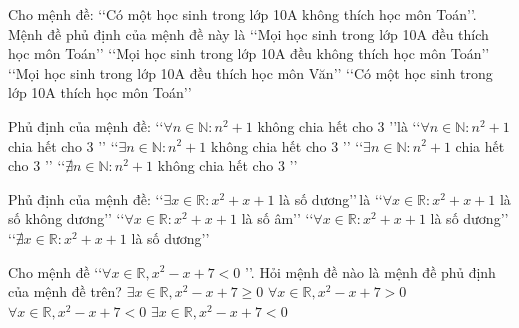 \begin{ex}%
	Cho mệnh đề: \lq\lq Có một học sinh trong lớp 10A không thích học môn Toán\rq\rq. Mệnh đề phủ  định của mệnh đề này là
	 \choice
		{\True \lq\lq Mọi học sinh  trong lớp 10A đều thích học môn Toán\rq\rq}
		{\lq\lq Mọi  học sinh trong lớp 10A đều không thích học môn Toán\rq\rq}
		{\lq\lq Mọi học sinh  trong lớp 10A đều thích học môn Văn\rq\rq}
		{\lq\lq Có một học sinh trong lớp 10A thích học  môn Toán\rq\rq}
\end{ex}

\begin{ex}%
	Phủ định của mệnh đề: \lq\lq $\forall n \in \mathbb{N}:  n^2+1$ không chia hết cho $3$ \rq\rq là
	\choice 
		 {\lq\lq $\forall n \in \mathbb{N}: n^2+1$ chia hết cho $3$ \rq\rq}
		{\lq\lq  $\exists n \in \mathbb{N}: n^2+1$ không chia hết cho $3$ \rq\rq}
		{\True \lq\lq $\exists n \in \mathbb{N}: n^2+1$ chia  hết cho $3$ \rq\rq}
		{\lq\lq $\nexists n \in \mathbb{N}:  n^2+1$ không chia hết cho $3$ \rq\rq}
\end{ex}

\begin{ex}%
	Phủ định của mệnh đề: \lq\lq $\exists x \in \mathbb{R}\colon x^2+x+1$ là số dương\rq\rq  \,là
	 \choice
		 {\True \lq\lq $\forall x \in \mathbb{R}\colon x^2+x+1$ là số không dương\rq\rq}
		{\lq\lq  $\forall x \in \mathbb{R}\colon x^2+x+1$ là số âm\rq\rq}
		{\lq\lq  $\forall x \in \mathbb{R}\colon x^2+x+1$ là số dương\rq\rq}
		{\lq\lq $\nexists x \in \mathbb{R}\colon x^2+x+1$ là số dương\rq\rq} 
\end{ex}

\begin{ex}%
	Cho mệnh đề  \lq\lq $\forall x \in \mathbb{R}, x^2-x+7<0$ \rq\rq. Hỏi mệnh đề nào là mệnh đề phủ định của mệnh đề trên?
	 \choice
		{\True $\exists x \in \mathbb{R}, x^2-x+7 \geq  0$}
		{$\forall x \in \mathbb{R}, x^2-x+7>0$} 
		{$\forall x \in \mathbb{R}, x^2-x+7<0$} 
		{$\exists x  \in \mathbb{R}, x^2-x+7<0$}
\end{ex}

